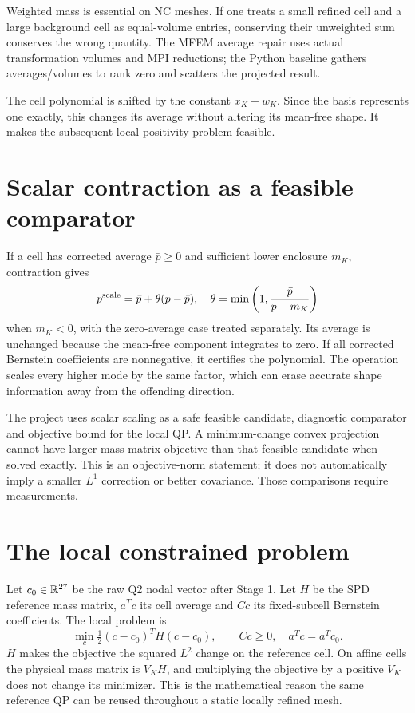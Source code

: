 Weighted mass is essential on NC meshes. If one treats a small refined cell and a large background cell as equal-volume entries, conserving their unweighted sum conserves the wrong quantity. The MFEM average repair uses actual transformation volumes and MPI reductions; the Python baseline gathers averages/volumes to rank zero and scatters the projected result.

The cell polynomial is shifted by the constant $x_K-w_K$. Since the basis represents one exactly, this changes its average without altering its mean-free shape. It makes the subsequent local positivity problem feasible.

\section{Scalar contraction as a feasible comparator}
If a cell has corrected average $\bar p\ge0$ and sufficient lower enclosure $m_K$, contraction gives
\begin{equation}\label{eq:scaling}
p^{\rm scale}=\bar p+\theta(p-\bar p),\quad
\theta=\min\left(1,\frac{\bar p}{\bar p-m_K}\right)
\end{equation}
when $m_K<0$, with the zero-average case treated separately. Its average is unchanged because the mean-free component integrates to zero. If all corrected Bernstein coefficients are nonnegative, it certifies the polynomial. The operation scales every higher mode by the same factor, which can erase accurate shape information away from the offending direction.

The project uses scalar scaling as a safe feasible candidate, diagnostic comparator and objective bound for the local QP. A minimum-change convex projection cannot have larger mass-matrix objective than that feasible candidate when solved exactly. This is an objective-norm statement; it does not automatically imply a smaller $L^1$ correction or better covariance. Those comparisons require measurements.

\section{The local constrained problem}
Let $c_0\in\mathbb R^{27}$ be the raw Q2 nodal vector after Stage 1. Let $H$ be the SPD reference mass matrix, $a^Tc$ its cell average and $Cc$ its fixed-subcell Bernstein coefficients. The local problem is
\begin{equation}\label{eq:local-qp}
\min_c\tfrac12(c-c_0)^TH(c-c_0),\qquad Cc\ge0,\quad a^Tc=a^Tc_0.
\end{equation}
$H$ makes the objective the squared $L^2$ change on the reference cell. On affine cells the physical mass matrix is $V_KH$, and multiplying the objective by a positive $V_K$ does not change its minimizer. This is the mathematical reason the same reference QP can be reused throughout a static locally refined mesh.

